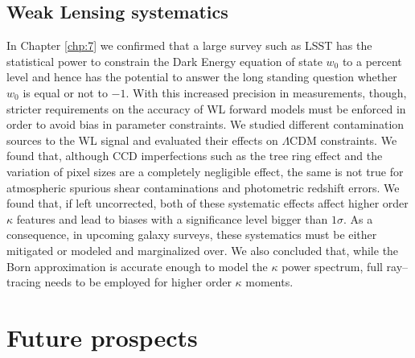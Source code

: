 \subsection{Weak Lensing systematics}
In Chapter \ref{chp:7} we confirmed that a large survey such as LSST has the statistical power to constrain the Dark Energy equation of state $w_0$ to a percent level and hence has the potential to answer the long standing question whether $w_0$ is equal or not to $-1$. With this increased precision in measurements, though, stricter requirements on the accuracy of WL forward models must be enforced in order to avoid bias in parameter constraints. We studied different contamination sources to the WL signal and evaluated their effects on $\Lambda$CDM constraints. We found that, although CCD imperfections such as the tree ring effect and the variation of pixel sizes are a completely negligible effect, the same is not true for atmospheric spurious shear contaminations and photometric redshift errors. We found that, if left uncorrected, both of these systematic effects affect higher order $\kappa$ features and lead to biases with a significance level bigger than $1\sigma$. As a consequence, in upcoming galaxy surveys, these systematics must be either mitigated or modeled and marginalized over. We also concluded that, while the Born approximation is accurate enough to model the $\kappa$ power spectrum, full ray--tracing needs to be employed for higher order $\kappa$ moments.      

\section{Future prospects}

